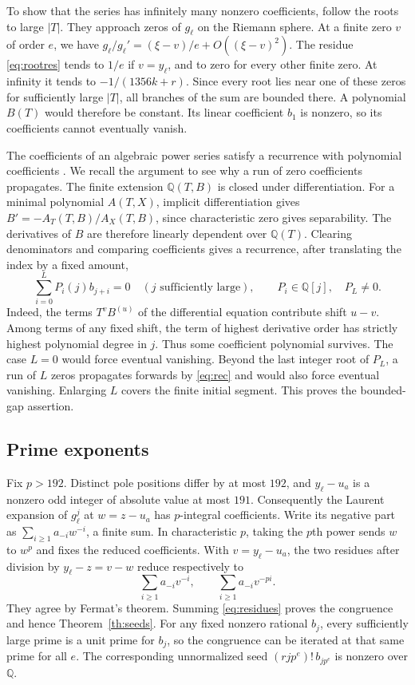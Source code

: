\documentclass[11pt]{article}
\numberwithin{equation}{section}
\newcommand{\Q}{\mathbb Q}
\begin{document}
To show that the series has infinitely many nonzero coefficients,
follow the roots to large \(|T|\).
They approach zeros of \(g_\ell\) on the Riemann sphere. At a finite
zero \(v\) of order \(e\), we have \(g_\ell/g_\ell'=(\xi-v)/e+
O((\xi-v)^2)\). The residue \eqref{eq:rootres} tends to \(1/e\) if
\(v=y_\ell\), and to zero for every other finite zero. At infinity
it tends to \(-1/(1356k+r)\). Since every root lies near one of
these zeros for sufficiently large \(|T|\), all branches of the sum
are bounded there. A polynomial \(B(T)\) would therefore be constant.
Its linear coefficient \(b_1\) is nonzero, so its coefficients cannot
eventually vanish.

The coefficients of an algebraic power series satisfy a recurrence with
polynomial coefficients \cite[Theorems~1.5 and~2.1]{stanley}. We recall
the argument to see why a run of zero coefficients propagates.
The finite extension \(\Q(T,B)\) is closed under differentiation.
For a minimal polynomial \(A(T,X)\), implicit differentiation gives
\(B'=-A_T(T,B)/A_X(T,B)\), since characteristic zero gives separability.
The derivatives of \(B\) are therefore linearly dependent over
\(\Q(T)\). Clearing denominators and comparing coefficients gives a
recurrence, after translating the index by a fixed amount,
\begin{equation}\label{eq:rec}
       \sum_{i=0}^{L}P_i(j)b_{j+i}=0\quad(j\text{ sufficiently large}),
       \qquad P_i\in\Q[j],\quad P_L\ne0.
\end{equation}
Indeed, the terms \(T^v B^{(u)}\) of the differential equation
contribute shift \(u-v\). Among terms of any fixed shift, the term
of highest derivative order has strictly highest polynomial degree
in \(j\). Thus some coefficient polynomial survives. The case \(L=0\)
would force eventual vanishing. Beyond the last integer root of
\(P_L\), a run of \(L\) zeros propagates forwards by \eqref{eq:rec}
and would also force eventual vanishing. Enlarging \(L\) covers the
finite initial segment. This proves the bounded-gap assertion.

\subsection{Prime exponents}

Fix \(p>192\). Distinct pole positions differ by at most \(192\), and
\(y_\ell-u_a\) is a nonzero odd integer of absolute value at most
\(191\). Consequently the Laurent expansion of \(g_\ell^j\) at
\(w=z-u_a\) has \(p\)-integral coefficients. Write its negative
part as \(\sum_{i\ge1}a_{-i}w^{-i}\), a finite sum. In characteristic
\(p\), taking the \(p\)th power sends \(w\) to \(w^p\) and fixes the
reduced coefficients. With \(v=y_\ell-u_a\), the two residues after
division by \(y_\ell-z=v-w\) reduce respectively to
\[
                  \sum_{i\ge1}a_{-i}v^{-i},
                  \qquad \sum_{i\ge1}a_{-i}v^{-pi}.
\]
They agree by Fermat's theorem. Summing \eqref{eq:residues} proves the
congruence and hence Theorem~\ref{th:seeds}. For any fixed nonzero
rational \(b_j\), every sufficiently large prime is a unit prime for
\(b_j\), so the congruence can be iterated at that same prime for all
\(e\). The corresponding unnormalized seed \((rjp^e)!\,b_{jp^e}\)
is nonzero over \(\Q\).
\end{document}

